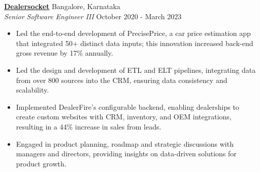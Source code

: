 \textbf{\href{https://dealersocket.com/}{Dealersocket}} \hfill Bangalore, Karnataka\\
\textit{Senior Software Engineer III} \hfill October 2020 - March 2023
\begin{itemize}[leftmargin=*]
  \itemsep0em
  \item Led the end-to-end development of PrecisePrice, a car price estimation app that integrated 50+ distinct data inputs; this innovation increased back-end gross revenue by 17\% annually.
  \item Led the design and development of ETL and ELT pipelines, integrating data from
    over 800 sources into the CRM, ensuring data consistency and scalability.
  \item Implemented DealerFire's configurable backend, enabling dealerships to create custom websites with CRM, inventory, and OEM integrations, resulting in a 44\% increase in sales from leads.
  \item Engaged in product planning, roadmap and strategic discussions with managers and
    directors, providing insights on data-driven solutions for product growth.
\end{itemize}
